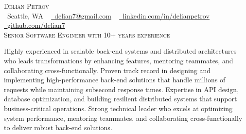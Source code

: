 \documentclass[letterpaper,12pt]{article}
\begin{document}
\begin{center}
    {\Huge \scshape Delian Petrov} \\ \vspace{8pt}
    \small \raisebox{-0.1\height}\faMapPin\ Seattle, WA
    ~ \href{mailto:delian7@gmail.com}{\raisebox{-0.2\height}\faEnvelope\  \underline{delian7@gmail.com}} ~
    \href{https://www.linkedin.com/in/delianpetrov/}{\raisebox{-0.2\height}\faLinkedin\ \underline{linkedin.com/in/delianpetrov}}  ~
    \href{https://github.com/delian7}{\raisebox{-0.2\height}\faGithub\ \underline{github.com/delian7}} \\ \vspace{16pt}
    {\Large \scshape Senior Software Engineer with 10+ years experience}
    \vspace{-8pt}
\end{center}

\begin{center}
\vspace{8pt}
Highly experienced in scalable back-end systems and distributed architectures who leads transformations by enhancing features, mentoring teammates, and collaborating cross-functionally. Proven track record in designing and implementing high-performance back-end solutions that handle millions of requests while maintaining subsecond response times. Expertise in API design, database optimization, and building resilient distributed systems that support business-critical operations. Strong technical leader who excels at optimizing system performance, mentoring teammates, and collaborating cross-functionally to deliver robust back-end solutions.
\end{center}

\end{document}
